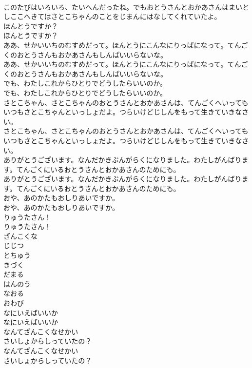 \documentclass[8pt]{extreport}
\begin{document}
\begin{CJK}{UTF8}{min}
\\	このたびはいろいろ、たいへんだったね。でもおとうさんとおかあさんはまいとしここへきてはさとこちゃんのことをじまんにはなしてくれていたよ。 
\\	ほんとうですか？	
\\	ほんとうですか？ 
\\	ああ、せかいいちのむすめだって。ほんとうにこんなにりっぱになって。てんごくのおとうさんもおかあさんもしんぱいいらないな。	
\\	ああ、せかいいちのむすめだって。ほんとうにこんなにりっぱになって。てんごくのおとうさんもおかあさんもしんぱいいらないな。 
\\	でも、わたしこれからひとりでどうしたらいいのか。	
\\	でも、わたしこれからひとりでどうしたらいいのか。 
\\	さとこちゃん、さとこちゃんのおとうさんとおかあさんは、てんごくへいってもいつもさとこちゃんといっしょだよ。つらいけどじしんをもって生きていきなさい。	
\\	さとこちゃん、さとこちゃんのおとうさんとおかあさんは、てんごくへいってもいつもさとこちゃんといっしょだよ。つらいけどじしんをもって生きていきなさい。 
\\	ありがとうございます。なんだかきぶんがらくになりました。わたしがんばります。てんごくにいるおとうさんとおかあさんのためにも。	
\\	ありがとうございます。なんだかきぶんがらくになりました。わたしがんばります。てんごくにいるおとうさんとおかあさんのためにも。 
\\	おや、あのかたもおしりあいですか。	
\\	おや、あのかたもおしりあいですか。 
\\	りゅうたさん！	
\\	りゅうたさん！ 
\\	ざんこくな
\\	じじつ
\\	とちゅう
\\	きづく
\\	だまる
\\	はんのう
\\	なおる
\\	おわび
\\	なにいえばいいか
\\	なにいえばいいか
\\	なんてざんこくなせかい
\\	さいしょからしっていたの？	
\\	なんてざんこくなせかい
\\	さいしょからしっていたの？ 

\end{CJK}
\end{document}
